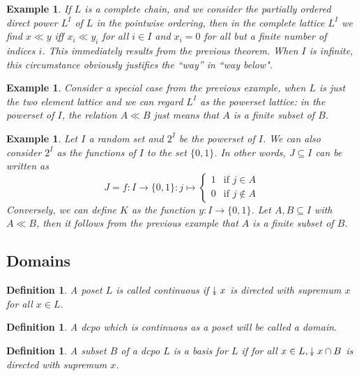 \documentclass[a4paper,12pt]{article}
\newcommand{\downdownarrow}{\mathrel{\reflectbox{\rotatebox[origin=c]{90}{$\twoheadleftarrow$}}}}
\newtheorem{example}[theorem]{Example}
\newtheorem{definition}[theorem]{Definition}
\begin{document}
\begin{example}
If $L$ is a complete chain, and we consider the partially ordered \emph{direct power} $L^I$ of $L$ in the pointwise ordering, then in the complete lattice $L^I$ we find $x \ll y$ iff $x_i \ll y_i$ for all $i \in I$ and $x_i = 0$ for all but a finite number of indices $i$. This immediately results from the previous theorem. When $I$ is infinite, this circumstance obviously justifies the ``way'' in ``way below".
\end{example}
\begin{example}
Consider a special case from the previous example, when $L$ is just the two element lattice and we can regard $L^I$ as the powerset lattice: in the powerset of $I$, the relation $A \ll B$ just means that $A$ is a finite subset of $B$.
\end{example}

\begin{example}\label{kutvoorbereiding}
Let $I$ a random set and $2^I$ be the powerset of $I$. We can also consider $2^I$ as the functions of $I$ to the set $\{0, 1\}$. In other words, $J \subseteq I$ can be written as
\begin{equation*}
  J = f: I \to \{0,1\}: j \mapsto \begin{cases}
    1 & \text{if $j \in A $}\\
    0 & \text{if $j \not\in A $}
  \end{cases}
\end{equation*}
Conversely, we can define $K$ as the function $y: I \to \{0, 1\}$. Let $A, B \subseteq I$ with $A \ll B$, then it follows from the previous example that $A$ is a finite subset of $B$.
\end{example}


\subsection{Domains}
\begin{definition}
A poset $L$ is called \emph{continuous} if $\downdownarrow x$ is directed with supremum $x$ for all $x \in L$.
\end{definition}

\begin{definition}
A dcpo which is continuous as a poset will be called a \emph{domain}.
\end{definition}


\begin{definition}
A subset $B$ of a dcpo $L$ is a \emph{basis} for $L$  if for all $x \in L, \downdownarrow x \cap B$ is directed with supremum $x$.
\end{definition}
\end{document}
